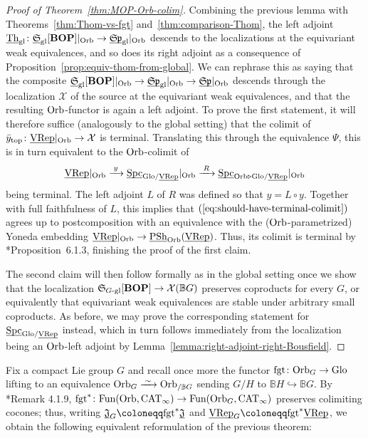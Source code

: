 \documentclass[reqno]{memo-l}
\theoremstyle{mythm}
\theoremstyle{definition}
\numberwithin{equation}{section}
\newcommand{\Xx}{{\mathcal X}}
\newcommand{\gl}{\textup{gl}}
\DeclareMathOperator{\Spc}{Spc}
\DeclareMathOperator{\CAT}{CAT}
\renewcommand{\top}{{\textup{top}}}
\newcommand{\Fun}{{\textup{Fun}}}
\DeclareMathOperator{\PSh}{PSh}
\newcommand{\cat}[1]{\textbf{\textup{#1}}}
\newcommand{\fgt}{\textup{fgt}}
\newcommand{\Orb}{{\vphantom{\textup{t}}\smash{\textup{Orb}}}}
\newcommand{\Glo}{\textup{Glo}}
\newcommand{\BGcat}[1]{\mathbb B{#1}}
\newcommand{\ulhelper}[2]{\underline{\setbox0=\hbox{$#1#2$}\dp0=0.4pt \box0\relax}}
\newcommand{\ul}[1]{{\mathpalette\ulhelper{#1}}\hbox{\rule[-2pt]{0pt}{0pt}}}
\newcommand{\iso}{\xrightarrow{\;\smash{\raisebox{-0.25ex}{\ensuremath{\scriptstyle\sim}}}\;}}
\newcommand{\mySp}{{\mathfrak S\kern-.5pt\mathfrak p}}
\newcommand{\myS}{{{\mathfrak S\kern-.4pt}}}
\newcommand{\Th}{{\textup{Th}}}
\newcommand{\VRep}{\textup{VRep}}
\begin{document}
\begin{proof}[Proof of Theorem~\ref{thm:MOP-Orb-colim}]
    Combining the previous lemma with Theorems~\ref{thm:Thom-vs-fgt} and~\ref{thm:comparison-Thom}, the left adjoint $\ul\Th_\gl\colon\ul\myS_\gl[\cat{BOP}]|_{\Orb}\to\ul\mySp_\gl|_{\Orb}$ descends to the localizations at the equivariant weak equivalences, and so does its right adjoint as a consequence of Proposition~\ref{prop:equiv-thom-from-global}. We can rephrase this as saying that the composite $\ul\myS_\gl[\cat{BOP}]|_{\Orb}\to\ul\mySp_\gl|_{\Orb}\to\ul\mySp|_{\Orb}$ descends through the localization $\Xx$ of the source at the equivariant weak equivalences, and that the resulting $\Orb$-functor is again a left adjoint. To prove the first statement, it will therefore suffice (analogously to the global setting) that the colimit of $\bar y_\top\colon\ul\VRep|_{\Orb}\to\Xx$ is terminal. Translating this through the equivalence $\Psi$, this is in turn equivalent to the $\Orb$-colimit of 
    \begin{equation}\label{eq:should-have-terminal-colimit}
        \ul\VRep|_{\Orb}\xrightarrow{\;y\;}\ul\Spc_{\Glo/\ul\VRep}|_{\Orb}\xrightarrow{\;R\;}\ul\Spc_{\Orb\triangleright\Glo/\ul\VRep}|_{\Orb}
    \end{equation}
    being terminal. The left adjoint $L$ of $R$ was defined so that $y=L\circ y$. Together with full faithfulness of $L$, this implies that $(\ref{eq:should-have-terminal-colimit})$ agrees up to postcomposition with an equivalence with the ($\Orb$-parametrized) Yoneda embedding $\smash{\ul\VRep}|_{\Orb}\to\ul\PSh_{\Orb}(\ul\VRep)$. Thus, its colimit is terminal by \cite{martiniwolf2021limits}*{Proposition~6.1.3}, finishing the proof of the first claim.

    The second claim will then follow formally as in the global setting once we show that the localization $\myS_\text{$G$-gl}[\cat{BOP}]\to\Xx(\BGcat{G})$ preserves coproducts for every $G$, or equivalently that equivariant weak equivalences are stable under arbitrary small coproducts. As before, we may prove the corresponding statement for $\ul\Spc_{\Glo/\ul\VRep}$ instead, which in turn follows immediately from the localization being an $\Orb$-left adjoint by Lemma~\ref{lemma:right-adjoint-right-Bousfield}.
\end{proof}

Fix a compact Lie group $G$ and recall once more the functor $\fgt\colon\Orb_{G}\to\Glo$ lifting to an equivalence $\Orb_G\iso\Orb_{/\BGcat{G}}$ sending $G/H$ to $\BGcat{H}\hookrightarrow\BGcat{G}$. By \cite{martiniwolf2021limits}*{Remark 4.1.9}, $\fgt^*\colon\Fun(\Orb,\CAT_\infty)\to\Fun(\Orb_G,\CAT_\infty)$ preserves colimiting cocones; thus, writing $\ul{\mathfrak J}_G\coloneqq\fgt^*\ul{\mathfrak J}$ and $\ul\VRep_G\coloneqq\fgt^*\ul\VRep$, we obtain the following equivalent reformulation of the previous theorem:
\end{document}
